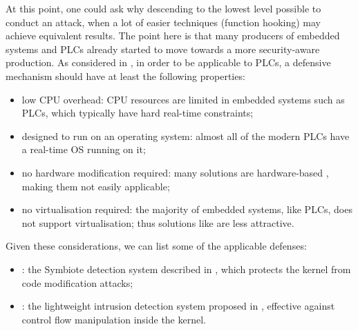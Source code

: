 At this point, one could ask why descending to the lowest level possible to conduct an attack, when a lot of easier techniques (\eg function hooking) may achieve equivalent results.
The point here is that many producers of embedded systems and PLCs already started to move towards a more security-aware production.
As considered in \cite{ghostplc}, in order to be applicable to PLCs, a defensive mechanism should have at least the following properties:
\begin{itemize}
	\item low CPU overhead: CPU resources are limited in embedded systems such as PLCs, which typically have hard real-time constraints;
	\item designed to run on an operating system: almost all of the modern PLCs have a real-time OS running on it;
	\item no hardware modification required: many solutions are hardware-based \cite{trustlite,hardware-ibmac,ocfmm,fine-grained,bb-cfi}, making them not easily applicable;
	\item no virtualisation required: the majority of embedded systems, like PLCs, does not support virtualisation;
		thus solutions like \cite{hypervisor-control} are less attractive.
\end{itemize}

Given these considerations, we can list some of the applicable defenses:
\begin{itemize}
	\item {}: the Symbiote detection system described in \cite{symbiotes}, which protects the kernel from code modification attacks;
	\item {}: the lightweight intrusion detection system proposed in \cite{autoscopy}, effective against control flow manipulation inside the kernel.
\end{itemize}

